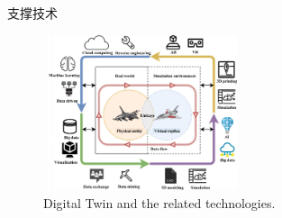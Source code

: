 \begin{frame}{支撑技术}
\begin{figure}[h!]
\vspace*{-0.15in}
\centering
     \includegraphics[height=1.8in, width=2.3in, viewport=0 0 1416 1171,clip]{Figures/Digital-Twin_related-technologies.png}
\caption{\tiny \textrm{Digital Twin and the related technologies.}}%
\label{Fig:Digital-Twin_related-technologies}
\end{figure} 
\vspace*{-0.15in}
  \begin{columns}
\fontsize{8.2pt}{6.2pt}
\fontsize{8.2pt}{6.2pt}
 \end{columns}
\end{frame}

